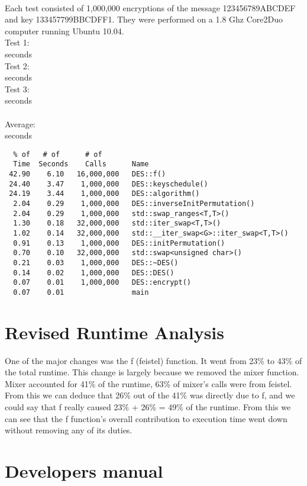 \documentclass[10pt]{article}
\begin{document}
\paragraph{}Each test consisted of 1,000,000 encryptions of the message 123456789ABCDEF and key 133457799BBCDFF1. They were performed on a 1.8 Ghz Core2Duo computer running Ubuntu 10.04.
\\Test 1:
\\  seconds
\\Test 2:
\\  seconds
\\Test 3:
\\  seconds
\\\\Average:
\\  seconds
\begin{verbatim}
  % of   # of      # of
  Time  Seconds    Calls      Name
 42.90    6.10   16,000,000   DES::f()
 24.40    3.47    1,000,000   DES::keyschedule()
 24.19    3.44    1,000,000   DES::algorithm()
  2.04    0.29    1,000,000   DES::inverseInitPermutation()
  2.04    0.29    1,000,000   std::swap_ranges<T,T>()
  1.30    0.18   32,000,000   std::iter_swap<T,T>()
  1.02    0.14   32,000,000   std::__iter_swap<G>::iter_swap<T,T>()
  0.91    0.13    1,000,000   DES::initPermutation()
  0.70    0.10   32,000,000   std::swap<unsigned char>()
  0.21    0.03    1,000,000   DES::~DES()
  0.14    0.02    1,000,000   DES::DES()
  0.07    0.01    1,000,000   DES::encrypt()
  0.07    0.01                main
\end{verbatim}

\section{Revised Runtime Analysis}
  One of the major changes was the f (feistel) function. It went from 23\% to 43\% of the total runtime.  This change is largely because we removed the mixer function. Mixer accounted for 41\% of the runtime, 63\% of mixer's calls were from feistel.  From this we can deduce that 26\% out of the 41\% was directly due to f, and we could say that f really caused 23\% + 26\% = 49\% of the runtime.  From this we can see that the f function's overall contribution to execution time went down without removing any of its duties. 
\section{Developers manual}
\end{document}
